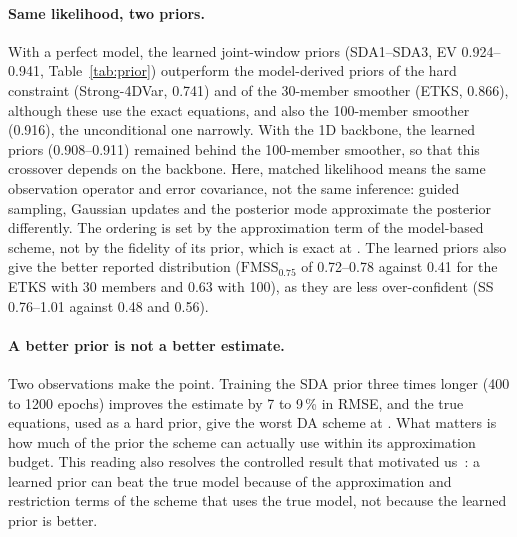 \paragraph{Same likelihood, two priors.}
With a perfect model, the learned joint-window priors (SDA1--SDA3, EV 0.924--0.941,
Table~\ref{tab:prior}) outperform the model-derived priors of the hard constraint (Strong-4DVar, 0.741)
and of the 30-member smoother (ETKS, 0.866), although these use the exact equations, and also the
100-member smoother (0.916), the unconditional one narrowly. With the 1D backbone, the learned priors
(0.908--0.911) remained behind the 100-member smoother, so that this crossover depends on the
backbone. Here, matched likelihood means the same
observation operator and error covariance, not the same inference: guided sampling, Gaussian
updates and the posterior mode approximate the posterior differently. The ordering is set by the approximation term
of the model-based scheme, not by the fidelity of its prior, which is exact at \Sz{}. The
learned priors also give the better reported distribution ($\mathrm{FMSS}_{0.75}$ of
0.72--0.78 against 0.41 for the ETKS with 30 members and 0.63 with 100), as they are less
over-confident (SS 0.76--1.01 against 0.48 and 0.56).

\paragraph{A better prior is not a better estimate.}
Two observations make the point. Training the SDA prior three times longer (400 to 1200
epochs) improves the estimate by 7 to 9\,\% in RMSE, and the true equations, used as a hard
prior, give the worst DA scheme at \Sz. What matters is how much of the prior the scheme
can actually use within its approximation budget. This reading also resolves the
controlled result that motivated us~\cite{fablet_learning_2021}: a learned prior can beat
the true model because of the approximation and restriction terms of the scheme that uses
the true model, not because the learned prior is better.

